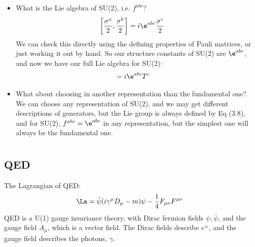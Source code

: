 \documentclass[relqm.tex]{subfiles}
\begin{document}
\begin{itemize}
    \item What is the Lie algebra of SU(2), i.e. $f^{abc}$?
        \begin{align}
            \left[\frac{\sigma^a}{2},\frac{\sigma^b}{2}\right] &= i\e^{abc}\frac{\sigma^c}{2}
        \end{align}
        We can check this directly using the defining properties of Pauli matrices, or just working it out by hand. 
        So our structure constants of SU(2) are $\e^{abc}$, and now we have our full Lie algebra for SU(2):
        \begin{align}
            [T^a,T^b] &= i\e^{abc}T^c
        \end{align}
    \item What about choosing in another representation than the fundamental one?\\
        We can choose any representation of SU(2), and we may get different descriptions of generators, but the Lie group is always defined by Eq (3.8), and for SU(2), $f^{abc} = \e^{abc}$ in any representation, but the simplest one will always be the fundamental one.
\end{itemize}

\chapter{}

\chapter{}
\section{QED}
The Lagrangian of QED:
\begin{align}
    \La = \bar{\psi}(i\gamma^\mu D_\mu - m)\psi - \frac14 F_{\mu\nu}F^{\mu\nu}
\end{align}
QED is a U(1) gauge invariance theory, with Dirac fermion fields $\psi,\bar{\psi}$, and the gauge field $A_\mu$, which is a vector field.
The Dirac fields describe $e^{\pm}$, and the gauge field describes the photons, $\gamma$.
\end{document}
